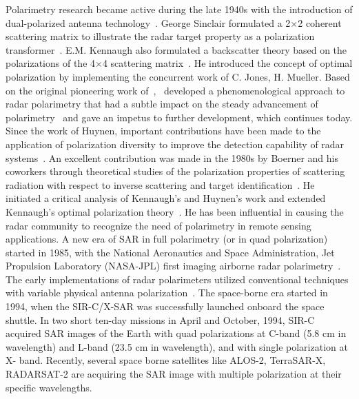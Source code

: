 Polarimetry research became active during the late 1940s with the introduction of dual-polarized antenna technology~\citep{kennaugh1952effects,sinclair1950transmission,rumsey1951techniques,hagfors1967study,mccormick1973method,mccormick1985optimal}. George Sinclair formulated a 2$\times$2 coherent scattering matrix to illustrate the radar target property as a polarization transformer~\citep{sinclair1950transmission}. E.M. Kennaugh also formulated a backscatter theory based on the polarizations of the 4$\times$4 scattering matrix~\citep{kennaugh1952effects}. He introduced the concept of optimal polarization by implementing the concurrent work of C. Jones, H. Mueller. Based on the original pioneering work of~\citep{kennaugh1952effects},~\citep{huynen1970} developed a phenomenological approach to radar polarimetry that had a subtle impact on the steady advancement of polarimetry~\citep{giuli1986polarization} and gave an impetus to further development, which continues today. Since the work of Huynen, important contributions have been made to the application of polarization diversity to improve the detection capability of radar systems~\citep{ioannidis1979optimum,poelman1984multinoch,swartz1988optimal}. An excellent contribution was made in the 1980s by Boerner and his coworkers through theoretical studies of the polarization properties of scattering radiation with respect to inverse scattering and target  identification~\citep{Agrawal1989,boerner1981use,boerner1991basic,boerner1993development,boerner1991basic,davidovitz1986extension,foo1984high,kostinski1986foundations}. He initiated a critical analysis of Kennaugh’s and Huynen’s work and extended Kennaugh’s optimal polarization theory~\citep{boerner1991basic}. He has been influential in causing the radar community to recognize the need of polarimetry in remote sensing applications. A new era of SAR in full polarimetry (or in quad polarization) started in 1985, with the National Aeronautics and Space Administration, Jet Propulsion Laboratory (NASA-JPL) first imaging airborne radar polarimetry~\citep{van1989unsupervised,zebker1987imaging}. The early implementations of radar polarimeters utilized conventional techniques with variable physical antenna polarization~\citep{hagfors1967study,zebker1987imaging}. The space-borne era started in 1994, when the SIR-C/X-SAR was successfully launched onboard the space shuttle.  In two short ten-day missions in April and October, 1994, SIR-C acquired SAR images of the Earth with quad polarizations at C-band (5.8 cm in wavelength) and L-band (23.5 cm in wavelength), and with single polarization at X- band. Recently, several space borne satellites like ALOS-2, TerraSAR-X, RADARSAT-2 are acquiring the SAR image with multiple polarization at their specific wavelengths.
    
